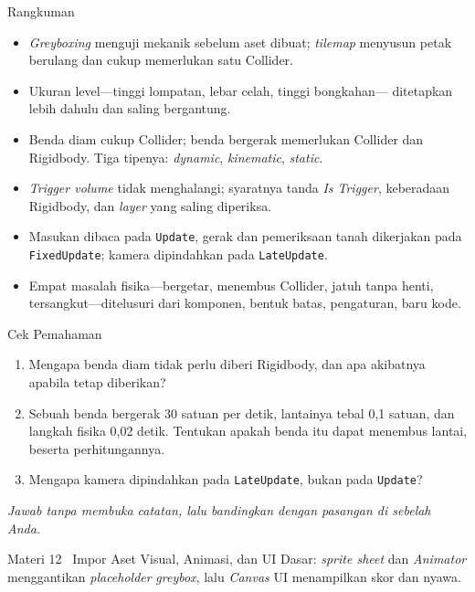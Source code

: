 \documentclass[aspectratio=169,10pt]{beamer}
\begin{document}
\begin{frame}{Rangkuman}
\begin{itemize}
  \item \emph{Greyboxing} menguji mekanik sebelum aset dibuat; \emph{tilemap}
        menyusun petak berulang dan cukup memerlukan satu Collider.
  \item Ukuran level---tinggi lompatan, lebar celah, tinggi bongkahan---
        ditetapkan lebih dahulu dan saling bergantung.
  \item Benda diam cukup Collider; benda bergerak memerlukan Collider dan
        Rigidbody. Tiga tipenya: \emph{dynamic}, \emph{kinematic},
        \emph{static}.
  \item \emph{Trigger volume} tidak menghalangi; syaratnya tanda
        \emph{Is Trigger}, keberadaan Rigidbody, dan \emph{layer} yang saling
        diperiksa.
  \item Masukan dibaca pada \texttt{Update}, gerak dan pemeriksaan tanah
        dikerjakan pada \texttt{FixedUpdate}; kamera dipindahkan pada
        \texttt{LateUpdate}.
  \item Empat masalah fisika---bergetar, menembus Collider, jatuh tanpa henti,
        tersangkut---ditelusuri dari komponen, bentuk batas, pengaturan, baru
        kode.
\end{itemize}
\end{frame}

\begin{frame}{Cek Pemahaman}
\begin{enumerate}
  \item Mengapa benda diam tidak perlu diberi Rigidbody, dan apa akibatnya
        apabila tetap diberikan?
  \item Sebuah benda bergerak 30 satuan per detik, lantainya tebal 0,1 satuan,
        dan langkah fisika 0,02 detik. Tentukan apakah benda itu dapat menembus
        lantai, beserta perhitungannya.
  \item Mengapa kamera dipindahkan pada \texttt{LateUpdate}, bukan pada
        \texttt{Update}?
\end{enumerate}
\vspace{0.35cm}
{\footnotesize\color{ubMuted}\itshape Jawab tanpa membuka catatan, lalu
bandingkan dengan pasangan di sebelah Anda.}
\end{frame}

  {Materi 12 \textperiodcentered\ Impor Aset Visual, Animasi, dan UI Dasar:
   \emph{sprite sheet} dan \emph{Animator} menggantikan \emph{placeholder}
   \emph{greybox}, lalu \emph{Canvas} UI menampilkan skor dan nyawa.}
\end{document}
